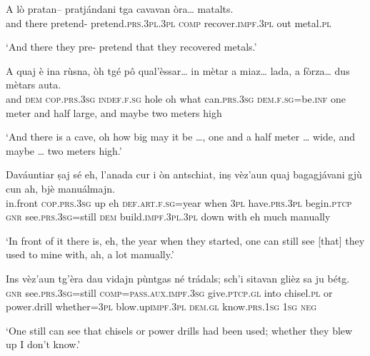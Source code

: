 \begin{linenumbers}
\gll  A lò pratan– pratjándani tga cavavan òra… matalts.  \\
and there pretend- pretend.\textsc{prs.3pl.3pl} \textsc{comp} recover.\textsc{impf.3pl} out metal.\textsc{pl}   \\
\end{linenumbers}
\medskip
\glt `And there they pre- pretend that they recovered metals.'
\medskip

\begin{linenumbers}
\gll A quaj è ina rùsna, òh tgé pô qual'èssar… in mètar a miaz… lada, a fòrza… dus mètars auta.   \\
and \textsc{dem}  \textsc{cop.prs.3sg} \textsc{indef.f.sg} hole oh what  can.\textsc{prs.3sg} \textsc{dem.f.sg}=be.\textsc{inf} one meter and half  large, and maybe two meters high \\
\end{linenumbers}
\medskip
\glt `And there is a cave, oh how big may it be …, one and a half meter … wide, and maybe … two meters high.'
\medskip

\begin{linenumbers}
\gll Daváuntiar ṣaj sé eh, l’anada cur i òn antschiat, inṣ vèz’aun quaj bagagjávani gjù cun ah, bjè manuálmajn.   \\
in.front  \textsc{cop.prs.3sg} up eh   \textsc{def.art.f.sg}=year  when \textsc{3pl}  have.\textsc{prs.3pl}  begin.\textsc{ptcp}  \textsc{gnr}  see.\textsc{prs.3sg=}still  \textsc{dem} build.\textsc{impf.3pl.3pl} down with eh much manually   \\
\end{linenumbers}
\medskip
\glt `In front of it there is, eh, the year when they started, one can still see [that] they used to mine with, ah, a lot manually.'
\medskip

\begin{linenumbers}
\gll Ins vèz’aun tg’èra dau vidajn pùntgas né trádals; sch’i sitavan glièz sa ju bétg.   \\
\textsc{gnr} see.\textsc{prs.3sg=}still \textsc{comp}=\textsc{pass.aux.impf.3sg} give.\textsc{ptcp.gl} into chisel.\textsc{pl} or  power.drill whether=\textsc{3pl} blow.up\textsc{impf.3pl} \textsc{dem.gl} know.\textsc{prs.1sg} \textsc{1sg} \textsc{neg}  \\
\end{linenumbers}
\medskip
\glt `One still can see that chisels or power drills had been used; whether they blew up I don’t know.'
\medskip

